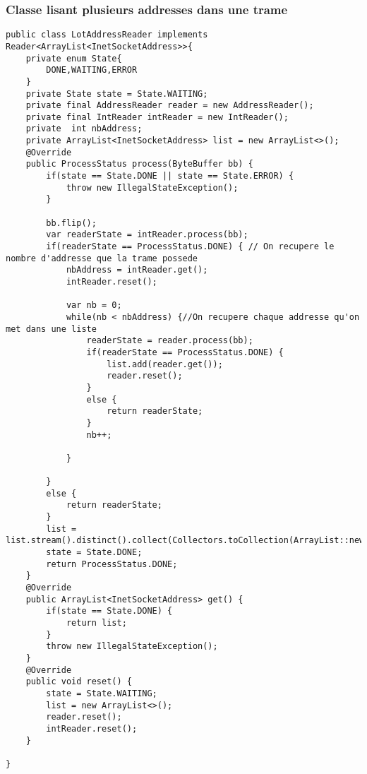 \documentclass[a4paper,titlepage]{report}
\begin{document}
\subsubsection{Classe lisant plusieurs addresses dans une trame}
\begin{lstlisting}
public class LotAddressReader implements Reader<ArrayList<InetSocketAddress>>{
	private enum State{
		DONE,WAITING,ERROR
	}
	private State state = State.WAITING;
	private final AddressReader reader = new AddressReader();
	private final IntReader intReader = new IntReader();
	private  int nbAddress;
	private ArrayList<InetSocketAddress> list = new ArrayList<>();
	@Override
	public ProcessStatus process(ByteBuffer bb) {
		if(state == State.DONE || state == State.ERROR) {
			throw new IllegalStateException();
		}

		bb.flip();
		var readerState = intReader.process(bb);
		if(readerState == ProcessStatus.DONE) { // On recupere le nombre d'addresse que la trame possede
			nbAddress = intReader.get();
			intReader.reset();

			var nb = 0;
			while(nb < nbAddress) {//On recupere chaque addresse qu'on met dans une liste
				readerState = reader.process(bb);
				if(readerState == ProcessStatus.DONE) {
					list.add(reader.get());
					reader.reset();
				}
				else {
					return readerState;
				}
				nb++;
				
			}
			
		}
		else {
			return readerState;
		}
		list = list.stream().distinct().collect(Collectors.toCollection(ArrayList::new));
		state = State.DONE;
		return ProcessStatus.DONE;
	}
	@Override
	public ArrayList<InetSocketAddress> get() {
		if(state == State.DONE) {
			return list;
		}
		throw new IllegalStateException();
	}
	@Override
	public void reset() {
		state = State.WAITING;
		list = new ArrayList<>();
		reader.reset();
		intReader.reset();
	}
	
}
\end{lstlisting}
\pagebreak
\end{document}

